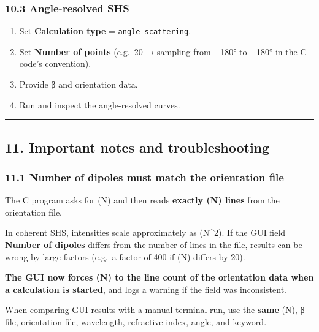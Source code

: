 \hypertarget{angle-resolved-shs}{%
\subsubsection{10.3 Angle-resolved SHS}\label{angle-resolved-shs}}

\begin{enumerate}
\def\labelenumi{\arabic{enumi}.}
\tightlist
\item
  Set \textbf{Calculation type} = \texttt{angle\_scattering}.\\
\item
  Set \textbf{Number of points} (e.g.~20 → sampling from −180° to +180°
  in the C code's convention).\\
\item
  Provide β and orientation data.\\
\item
  Run and inspect the angle-resolved curves.
\end{enumerate}

\begin{center}\rule{0.5\linewidth}{0.5pt}\end{center}

\hypertarget{important-notes-and-troubleshooting}{%
\subsection{11. Important notes and
troubleshooting}\label{important-notes-and-troubleshooting}}

\hypertarget{number-of-dipoles-must-match-the-orientation-file}{%
\subsubsection{11.1 Number of dipoles must match the orientation
file}\label{number-of-dipoles-must-match-the-orientation-file}}

The C program asks for (N) and then reads \textbf{exactly (N) lines}
from the orientation file.

In coherent SHS, intensities scale approximately as (N\^{}2). If the GUI
field \textbf{Number of dipoles} differs from the number of lines in the
file, results can be wrong by large factors (e.g.~a factor of 400 if (N)
differs by 20).

\textbf{The GUI now forces (N) to the line count of the orientation data
when a calculation is started}, and logs a warning if the field was
inconsistent.

When comparing GUI results with a manual terminal run, use the
\textbf{same} (N), β file, orientation file, wavelength, refractive
index, angle, and keyword.

